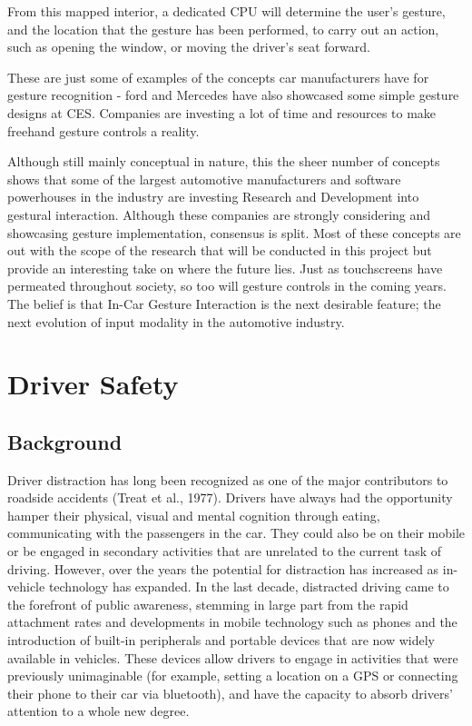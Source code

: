 \documentclass{l4proj}
\begin{document}
From this mapped interior, a dedicated CPU will determine the user's gesture, and the location that the gesture has been performed, to carry out an action, such as opening the window, or moving the driver's seat forward\cite{goog}.

These are just some of examples of the concepts car manufacturers have for gesture recognition - ford and Mercedes have also showcased some simple gesture designs at CES. Companies are investing a lot of time and resources to make freehand gesture controls a reality.

Although still mainly conceptual in nature, this the sheer number of concepts shows that some of the largest automotive manufacturers and software powerhouses in the industry are investing Research and Development into gestural interaction. Although these companies are strongly considering and showcasing gesture implementation, consensus is split. Most of these concepts are out with the scope of the research that will be conducted in this project but provide an interesting take on where the future lies. Just as touchscreens have permeated throughout society, so too will gesture controls in the coming years. The belief is that In-Car Gesture Interaction is the next desirable feature; the next evolution of input modality in the automotive industry.  

\section{Driver Safety}
\vspace{-3mm}
\subsection{Background}
\vspace{-3mm}
Driver distraction has long been recognized as one of the major contributors to roadside accidents (Treat et al., 1977). Drivers have always had the opportunity hamper their physical, visual and mental cognition through eating, communicating with the passengers in the car. They could also be on their mobile or be engaged in secondary activities that are unrelated to the current task of driving. However, over the years the potential for distraction has increased as in-vehicle technology has expanded. In the last decade, distracted driving came to the forefront of public awareness, stemming in large part from the rapid attachment rates and developments in mobile technology such as phones and the introduction of built-in peripherals and portable devices that are now widely available in vehicles. These devices allow drivers to engage in activities that were previously unimaginable (for example, setting a location on a GPS or connecting their phone to their car via bluetooth), and have the capacity to absorb drivers’ attention to a whole new degree. 
\end{document}
